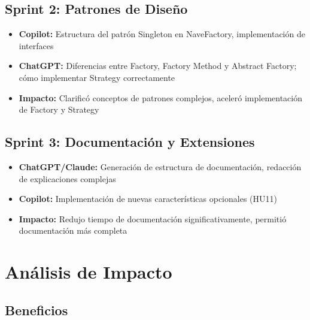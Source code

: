 \documentclass[12pt, a4paper]{article}
\begin{document}
\subsection{Sprint 2: Patrones de Diseño}

\begin{itemize}[leftmargin=2em]
    \item \textbf{Copilot:} Estructura del patrón Singleton en NaveFactory, implementación de interfaces
    \item \textbf{ChatGPT:} Diferencias entre Factory, Factory Method y Abstract Factory; cómo implementar Strategy correctamente
    \item \textbf{Impacto:} Clarificó conceptos de patrones complejos, aceleró implementación de Factory y Strategy
\end{itemize}

\subsection{Sprint 3: Documentación y Extensiones}

\begin{itemize}[leftmargin=2em]
    \item \textbf{ChatGPT/Claude:} Generación de estructura de documentación, redacción de explicaciones complejas
    \item \textbf{Copilot:} Implementación de nuevas características opcionales (HU11)
    \item \textbf{Impacto:} Redujo tiempo de documentación significativamente, permitió documentación más completa
\end{itemize}

\section{Análisis de Impacto}

\subsection{Beneficios}
\end{document}
